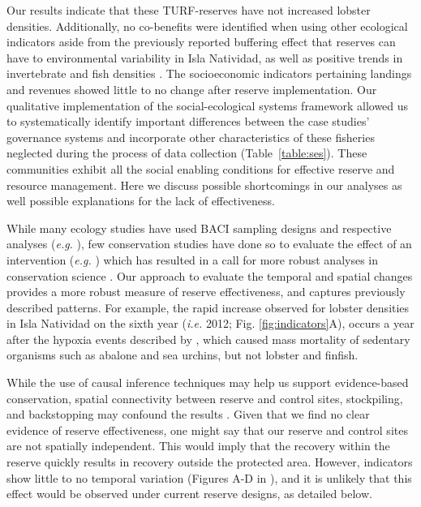 \documentclass[10pt,letterpaper]{article}
\begin{document}
Our results indicate that these TURF-reserves have not increased lobster densities. Additionally, no co-benefits were identified when using other ecological indicators aside from the previously reported buffering effect that reserves can have to environmental variability in Isla Natividad, as well as positive trends in invertebrate and fish densities \cite{micheli_2012-EU,Villasenor-Derbez_2018}. The socioeconomic indicators pertaining landings and revenues showed little to no change after reserve implementation. Our qualitative implementation of the social-ecological systems framework allowed us to systematically identify important differences between the case studies’ governance systems and incorporate other characteristics of these fisheries neglected during the process of data collection (Table~\ref{table:ses}). These communities exhibit all the social enabling conditions for effective reserve and resource management. Here we discuss possible shortcomings in our analyses as well possible explanations for the lack of effectiveness.

While many ecology studies have used BACI sampling designs and respective analyses (\emph{e.g.} \cite{stewartoaten_1986}), few conservation studies have done so to evaluate the effect of an intervention (\emph{e.g.} \cite{francinifilho_2008,lester_2009,moland_2013,kerr_2019}) which has resulted in a call for more robust analyses in conservation science \cite{guidetti_2002,ferraro_2006}. Our approach to evaluate the temporal and spatial changes provides a more robust measure of reserve effectiveness, and captures previously described patterns. For example, the rapid increase observed for lobster densities in Isla Natividad on the sixth year (\emph{i.e.} 2012; Fig. \ref{fig:indicators}A), occurs a year after the hypoxia events described by \cite{micheli_2012-EU}, which caused mass mortality of sedentary organisms such as abalone and sea urchins, but not lobster and finfish.

While the use of causal inference techniques may help us support evidence-based conservation, spatial connectivity between reserve and control sites, stockpiling, and backstopping may confound the results \cite{kerr_2019}. Given that we find no clear evidence of reserve effectiveness, one might say that our reserve and control sites are not spatially independent. This would imply that the recovery within the reserve quickly results in recovery outside the protected area. However, indicators show little to no temporal variation (Figures A-D in ), and it is unlikely that this effect would be observed under current reserve designs, as detailed below.
\end{document}
